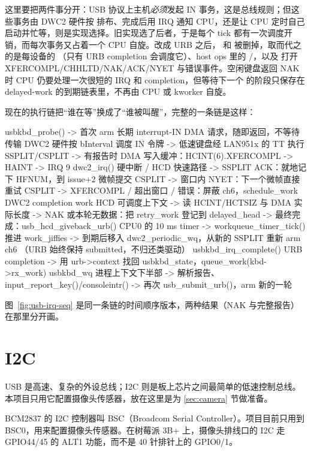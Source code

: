 这里要把两件事分开：USB 协议上主机\emph{必须}发起 IN 事务，这是总线规则；但这些事务由 DWC2 硬件按  排布、完成后用 IRQ 通知 CPU，还是让 CPU 定时自己启动并忙等，则是实现选择。旧实现选了后者，于是每个 tick 都有一次调度开销，而每次事务又占着一个 CPU 自旋。改成 URB 之后， 和  被删掉，取而代之的是每设备的 （只有 URB completion 会调度它）、host ops 里的 /，以及  打开 XFERCOMPL/CHHLTD/NAK/ACK/NYET 与错误事件。空闲键盘返回 NAK 时 CPU 仍要处理一次很短的 IRQ 和 completion，但等待下一个  的阶段只保存在 delayed-work 的到期链表里，不再由 CPU 或 kworker 自旋。

现在的执行链把“谁在等”换成了“谁被叫醒”，完整的一条链是这样：

\begin{txtcode}
usbkbd_probe()
  -> 首次 arm 长期 interrupt-IN DMA 请求，随即返回，不等待传输
DWC2 硬件按 bInterval 调度 IN 令牌
  -> 低速键盘经 LAN951x 的 TT 执行 SSPLIT/CSPLIT
  -> 有报告时 DMA 写入缓冲：HCINT(6).XFERCOMPL -> HAINT -> IRQ 9
dwc2_irq()                         硬中断 / HCD 快速路径
  -> SSPLIT ACK：就地记下 HFNUM，到 issue+2 微帧提交 CSPLIT
  -> 窗口内 NYET：下一个微帧直接重试 CSPLIT
  -> XFERCOMPL / 超出窗口 / 错误：屏蔽 ch6，schedule_work
DWC2 completion work               HCD 可调度上下文
  -> 读 HCINT/HCTSIZ 与 DMA 实际长度
  -> NAK 或本轮无数据：把 retry_work 登记到 delayed_head
  -> 最终完成：usb_hcd_giveback_urb()
CPU0 的 10 ms timer
  -> workqueue_timer_tick() 推进 work_jiffies
  -> 到期后移入 dwc2_periodic_wq，从新的 SSPLIT 重新 arm ch6
     （URB 始终保持 submitted，不归还类驱动）
usbkbd_irq_complete()              URB completion
  -> 用 urb->context 找回 usbkbd_state，queue_work(kbd->rx_work)
usbkbd_wq                          进程上下文下半部
  -> 解析报告、input_report_key()/consoleintr()
  -> 再次 usb_submit_urb()，arm 新的一轮
\end{txtcode}

图~\ref{fig:usb-irq-seq} 是同一条链的时间顺序版本，两种结果（NAK 与完整报告）在那里分开画。

\section{I2C}

USB 是高速、复杂的外设总线；I2C 则是板上芯片之间最简单的低速控制总线。本项目只用它配置摄像头传感器，放在这里是为 \ref{sec:camera} 节做准备。

BCM2837 的 I2C 控制器叫 BSC（Broadcom Serial Controller）。项目目前只用到 BSC0，用来配置摄像头传感器。在树莓派 3B+ 上，摄像头排线口的 I2C 走 GPIO44/45 的 ALT1 功能，而不是 40 针排针上的 GPIO0/1。

